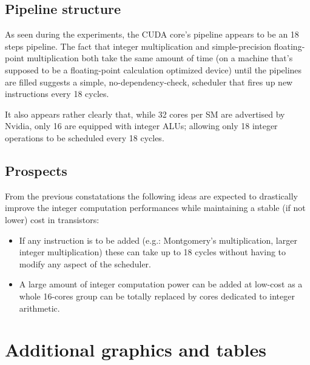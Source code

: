 \documentclass{report}
\begin{document}
    \subsection{Pipeline structure}
    As seen during the experiments, the CUDA core's pipeline appears to be an
    18 steps pipeline. The fact that integer multiplication and 
    simple-precision floating-point multiplication both take the same amount
    of time (on a machine that's supposed to be a floating-point calculation
    optimized device) until the pipelines are filled suggests a simple,
    no-dependency-check, scheduler that fires up new instructions every 18 cycles.

    It also appears rather clearly that, while 32 cores per SM are advertised by
    Nvidia, only 16 are equipped with integer ALUs; allowing only 18 integer
    operations to be scheduled every 18 cycles.
    
    \subsection{Prospects}
    From the previous constatations the following ideas are expected to drastically
    improve the integer computation performances while maintaining a stable (if not
    lower) cost in transistors:
    \begin{itemize}
        \item If any instruction is to be added (e.g.: Montgomery's multiplication, larger integer multiplication) these can take up to 18 cycles without having to modify any aspect of the scheduler.
        \item A large amount of integer computation power can be added at low-cost as a whole 16-cores group can be totally replaced by cores dedicated to integer arithmetic.
    \end{itemize}
\section{Additional graphics and tables}
\end{document}
